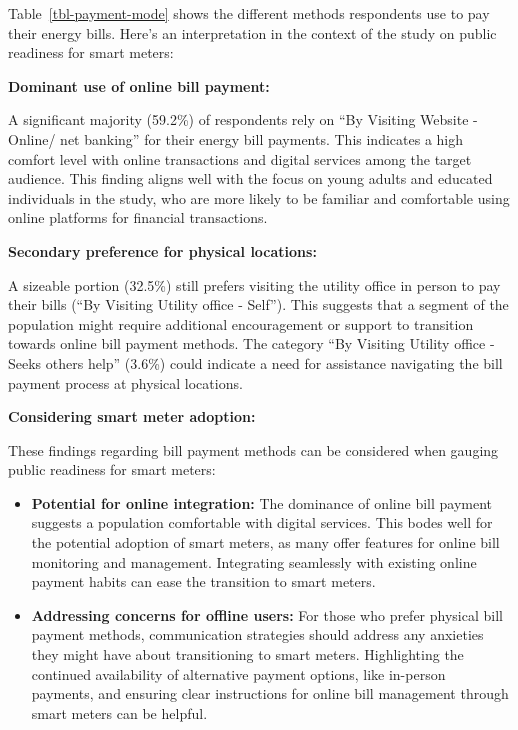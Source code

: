 \documentclass[
  letterpaper,
  DIV=11,
  numbers=noendperiod]{scrartcl}
\begin{document}
Table~\ref{tbl-payment-mode} shows the different methods respondents use
to pay their energy bills. Here's an interpretation in the context of
the study on public readiness for smart meters:

\textbf{Dominant use of online bill payment:}

A significant majority (59.2\%) of respondents rely on ``By Visiting
Website - Online/ net banking'' for their energy bill payments. This
indicates a high comfort level with online transactions and digital
services among the target audience. This finding aligns well with the
focus on young adults and educated individuals in the study, who are
more likely to be familiar and comfortable using online platforms for
financial transactions.

\textbf{Secondary preference for physical locations:}

A sizeable portion (32.5\%) still prefers visiting the utility office in
person to pay their bills (``By Visiting Utility office - Self''). This
suggests that a segment of the population might require additional
encouragement or support to transition towards online bill payment
methods. The category ``By Visiting Utility office - Seeks others help''
(3.6\%) could indicate a need for assistance navigating the bill payment
process at physical locations.

\textbf{Considering smart meter adoption:}

These findings regarding bill payment methods can be considered when
gauging public readiness for smart meters:

\begin{itemize}
\item
  \textbf{Potential for online integration:} The dominance of online
  bill payment suggests a population comfortable with digital services.
  This bodes well for the potential adoption of smart meters, as many
  offer features for online bill monitoring and management. Integrating
  seamlessly with existing online payment habits can ease the transition
  to smart meters.
\item
  \textbf{Addressing concerns for offline users:} For those who prefer
  physical bill payment methods, communication strategies should address
  any anxieties they might have about transitioning to smart meters.
  Highlighting the continued availability of alternative payment
  options, like in-person payments, and ensuring clear instructions for
  online bill management through smart meters can be helpful.
\end{itemize}
\end{document}
